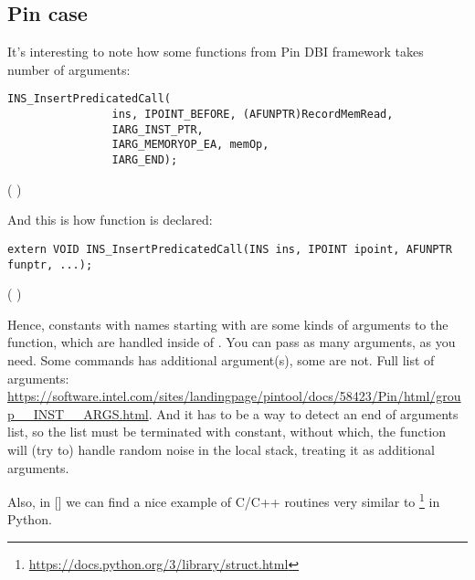 \subsection{Pin case}

It's interesting to note how some functions from Pin \ac{DBI} framework takes number of arguments:

\begin{lstlisting}[style=customc]
            INS_InsertPredicatedCall(
                ins, IPOINT_BEFORE, (AFUNPTR)RecordMemRead,
                IARG_INST_PTR,
                IARG_MEMORYOP_EA, memOp,
                IARG_END);
\end{lstlisting}
(  )

And this is how  function is declared:

\begin{lstlisting}[style=customc]
extern VOID INS_InsertPredicatedCall(INS ins, IPOINT ipoint, AFUNPTR funptr, ...);
\end{lstlisting}
(  )

Hence, constants with names starting with  are some kinds of arguments to the function,
which are handled inside of .
You can pass as many arguments, as you need.
Some commands has additional argument(s), some are not.
Full list of arguments:
\url{https://software.intel.com/sites/landingpage/pintool/docs/58423/Pin/html/group__INST__ARGS.html}.
And it has to be a way to detect an end of arguments list, so the list must be terminated with  constant,
without which, the function will (try to) handle random noise in the local stack, treating it as additional arguments.

Also, in [\RobPikePractice] we can find a nice example of C/C++ routines very similar to
\footnote{\url{https://docs.python.org/3/library/struct.html}} in Python.

